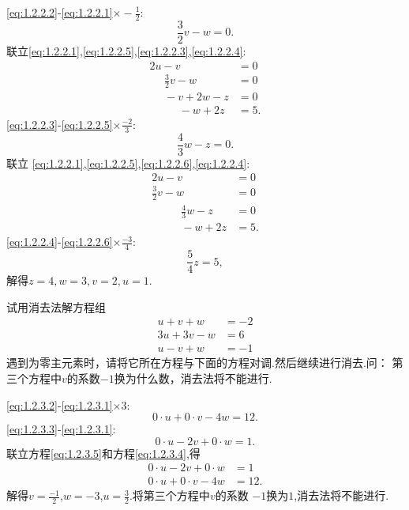 ﻿\documentclass{book} \usepackage{exsheets} \usepackage{xeCJK}
\begin{document}
\begin{solution}
 \eqref{eq:1.2.2.2}-\eqref{eq:1.2.2.1}$\times -\frac{1}{2}$:
 \begin{equation}
   \label{eq:1.2.2.5}
   \tag{5}
\frac{3}{2}v-w=0.
 \end{equation}
联立\eqref{eq:1.2.2.1},\eqref{eq:1.2.2.5},\eqref{eq:1.2.2.3},\eqref{eq:1.2.2.4}:
\begin{align*}
  2u-v~~~~~~~~~~~~&=0\\
~~~~~~\frac{3}{2}v-w~~~~~~&=0\\
~~~~~~-v+2w-z&=0\\
~~~~~~~~~~~~-w+2z&=5.
\end{align*}
\eqref{eq:1.2.2.3}-\eqref{eq:1.2.2.5}$\times \frac{-2}{3}$:
\begin{equation}\tag{6}
  \label{eq:1.2.2.6}
  \frac{4}{3}w-z=0.
\end{equation}
联立
\eqref{eq:1.2.2.1},\eqref{eq:1.2.2.5},\eqref{eq:1.2.2.6},\eqref{eq:1.2.2.4}:
\begin{align*}
  2u-v~~~~~~~~~~~~&=0\\
\frac{3}{2}v-w~~~~~~&=0\\
~~~~~~~~~~~~\frac{4}{3}w-z&=0\\
~~~~~~~~~~~~-w+2z&=5.
\end{align*}
\eqref{eq:1.2.2.4}-\eqref{eq:1.2.2.6}$\times \frac{-3}{4}$:
$$
\frac{5}{4}z=5,
$$
解得$z=4,w=3,v=2,u=1$.
\end{solution}
\begin{question}
  试用消去法解方程组
  \begin{align}
    u+ v+w&=-2\label{eq:1.2.3.1}\tag{1}\\
   3u+3v-w&=6\label{eq:1.2.3.2}\tag{2}\\
    u- v+w&=-1\label{eq:1.2.3.3}\tag{3}
  \end{align}
遇到为零主元素时，请将它所在方程与下面的方程对调.然后继续进行消去.问：
第三个方程中$v$的系数$-1$换为什么数，消去法将不能进行.
\end{question}
\begin{solution}
 \eqref{eq:1.2.3.2}-\eqref{eq:1.2.3.1}$\times 3$:
 \begin{equation}\tag{4}
   \label{eq:1.2.3.4}
0\cdot u+0\cdot v -4w=12.
 \end{equation}
\eqref{eq:1.2.3.3}-\eqref{eq:1.2.3.1}:
\begin{equation}
  \label{eq:1.2.3.5}
  \tag{5}
0\cdot u-2v+0\cdot w=1.
\end{equation}
联立方程\eqref{eq:1.2.3.5}和方程\eqref{eq:1.2.3.4},得
\begin{align*}
  0\cdot u-2v+0\cdot w&=1\\
 0\cdot u+0\cdot v-4w&=12.
\end{align*}
解得$v=\frac{-1}{2}$,$w=-3$,$u=\frac{3}{2}$.将第三个方程中$v$的系数
$-1$换为$1$,消去法将不能进行.
\end{solution}
\end{document}
